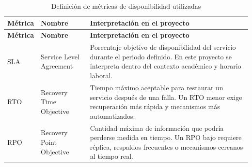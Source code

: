 \documentclass[11pt, a4paper, oneside]{report}
\begin{document}
\begin{xltabular}{\textwidth}{@{}|N{1.7cm}|L{4cm}|X|@{}}
\caption{Definición de métricas de disponibilidad utilizadas}
\label{tab:definicion_metricas_disponibilidad} \\

\parbox[c][1.1cm][c]{\linewidth}{\centering\color{white}\bfseries\small Métrica} &
\parbox[c][1.1cm][c]{\linewidth}{\centering\color{white}\bfseries\small Nombre} &
\parbox[c][1.1cm][c]{\linewidth}{\centering\color{white}\bfseries\small Interpretación en el proyecto} \\ \hline
\endfirsthead

\parbox[c][1.1cm][c]{\linewidth}{\centering\color{white}\bfseries\small Métrica} &
\parbox[c][1.1cm][c]{\linewidth}{\centering\color{white}\bfseries\small Nombre} &
\parbox[c][1.1cm][c]{\linewidth}{\centering\color{white}\bfseries\small Interpretación en el proyecto} \\ \hline
\endhead

\hline
\endfoot

{\small SLA} &
{\small Service Level Agreement} &
{\small Porcentaje objetivo de disponibilidad del servicio durante el periodo definido. En este proyecto se interpreta dentro del contexto académico y horario laboral.} \\ \hline

{\small RTO} &
{\small Recovery Time Objective} &
{\small Tiempo máximo aceptable para restaurar un servicio después de una falla. Un RTO menor exige recuperación más rápida y mecanismos más automatizados.} \\ \hline

{\small RPO} &
{\small Recovery Point Objective} &
{\small Cantidad máxima de información que podría perderse medida en tiempo. Un RPO bajo requiere réplica, respaldos frecuentes o mecanismos cercanos al tiempo real.} \\ \hline

\end{xltabular}

\normalsize
\end{document}
